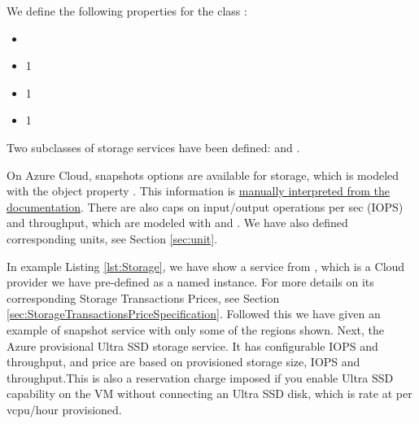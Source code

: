 \label{sec:Storage}
We define the following properties for the class :
\begin{itemize}
  \item[]   
  \item[]   1 
  \item[]   1 
  \item[]   1 
\end{itemize}
Two subclasses of storage services have been defined:  and .

On Azure Cloud, snapshots options are available for storage, which is modeled with
the object property . This information is 
\href{https://github.com/miranda-zhang/cloud-computing-schema/blob/master/example/azure/storage.md#disk-snapshots}{manually interpreted from the documentation}.
There are also caps on input/output operations per sec (IOPS) and throughput, which are modeled with
 and . We have also defined corresponding units, see Section \ref{sec:unit}.

In example Listing \ref{lst:Storage}, we have show a  service from , which is a Cloud provider we have pre-defined as a named instance.
For more details on its corresponding Storage Transactions Prices,
see Section \ref{sec:StorageTransactionsPriceSpecification}.
Followed this we have given an example of snapshot service with only some of the regions shown. Next, the Azure provisional Ultra SSD storage service. It has configurable IOPS and throughput, and price are based on provisioned storage size, IOPS and throughput.This is also a reservation charge imposed if you enable Ultra SSD capability on the VM without connecting an Ultra SSD disk, which is rate at per vcpu/hour provisioned.

